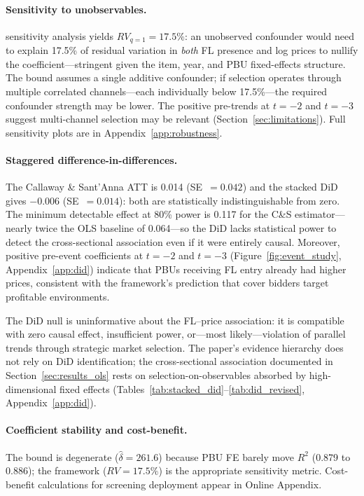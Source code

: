 \paragraph{Sensitivity to unobservables.}
\citet{cinelli2020making} sensitivity analysis yields $RV_{q=1} =
17.5\%$: an unobserved confounder would need to explain 17.5\% of
residual variation in \emph{both} FL presence and log prices to nullify
the coefficient---stringent given the item, year, and PBU fixed-effects
structure. The bound assumes a single additive confounder; if selection
operates through multiple correlated channels---each individually below
17.5\%---the required confounder strength may be lower. The positive
pre-trends at $t = -2$ and $t = -3$ suggest multi-channel selection
may be relevant (Section~\ref{sec:limitations}). Full sensitivity
plots are in Appendix~\ref{app:robustness}.


\paragraph{Staggered difference-in-differences.}
The Callaway \& Sant'Anna ATT is 0.014 (SE~$= 0.042$) and the stacked
DiD \citep{cengiz2019effect} gives $-0.006$ (SE~$= 0.014$): both are
statistically indistinguishable from zero. The minimum detectable effect
at 80\% power is 0.117 for the C\&S estimator---nearly twice the OLS
baseline of 0.064---so the DiD lacks statistical power to detect the
cross-sectional association even if it were entirely causal. Moreover,
positive pre-event coefficients at $t = -2$ and $t = -3$
(Figure~\ref{fig:event_study}, Appendix~\ref{app:did}) indicate that
PBUs receiving FL entry already had higher prices, consistent with
the framework's prediction that cover bidders target profitable
environments.

The DiD null is uninformative about the FL--price association: it is
compatible with zero causal effect, insufficient power, or---most
likely---violation of parallel trends through strategic market
selection. The paper's evidence hierarchy does not rely on DiD
identification; the cross-sectional association documented in
Section~\ref{sec:results_ols} rests on selection-on-observables
absorbed by high-dimensional fixed effects
(Tables~\ref{tab:stacked_did}--\ref{tab:did_revised},
Appendix~\ref{app:did}).

\paragraph{Coefficient stability and cost-benefit.}
The \citet{oster2019unobservable} bound is degenerate
($\hat{\delta} = 261.6$) because PBU FE barely move $R^2$ (0.879 to
0.886); the \citet{cinelli2020making} framework ($RV = 17.5\%$) is
the appropriate sensitivity metric. Cost-benefit calculations for
screening deployment appear in Online Appendix.


